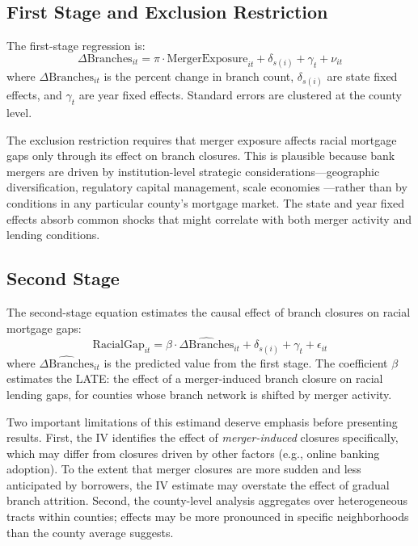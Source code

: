 \documentclass[12pt]{article}
\begin{document}
\subsection{First Stage and Exclusion Restriction}

The first-stage regression is:
\begin{equation}
\Delta\text{Branches}_{it} = \pi \cdot \text{MergerExposure}_{it} + \delta_{s(i)} + \gamma_t + \nu_{it}
\label{eq:first_stage}
\end{equation}
where $\Delta\text{Branches}_{it}$ is the percent change in branch count, $\delta_{s(i)}$ are state fixed effects, and $\gamma_t$ are year fixed effects. Standard errors are clustered at the county level.

The exclusion restriction requires that merger exposure affects racial mortgage gaps only through its effect on branch closures. This is plausible because bank mergers are driven by institution-level strategic considerations---geographic diversification, regulatory capital management, scale economies \citep{erel2011, berger1998}---rather than by conditions in any particular county's mortgage market. The state and year fixed effects absorb common shocks that might correlate with both merger activity and lending conditions.

\subsection{Second Stage}

The second-stage equation estimates the causal effect of branch closures on racial mortgage gaps:
\begin{equation}
\text{RacialGap}_{it} = \beta \cdot \widehat{\Delta\text{Branches}}_{it} + \delta_{s(i)} + \gamma_t + \epsilon_{it}
\label{eq:second_stage}
\end{equation}
where $\widehat{\Delta\text{Branches}}_{it}$ is the predicted value from the first stage. The coefficient $\beta$ estimates the LATE: the effect of a merger-induced branch closure on racial lending gaps, for counties whose branch network is shifted by merger activity.

Two important limitations of this estimand deserve emphasis before presenting results. First, the IV identifies the effect of \emph{merger-induced} closures specifically, which may differ from closures driven by other factors (e.g., online banking adoption). To the extent that merger closures are more sudden and less anticipated by borrowers, the IV estimate may overstate the effect of gradual branch attrition. Second, the county-level analysis aggregates over heterogeneous tracts within counties; effects may be more pronounced in specific neighborhoods than the county average suggests.
\end{document}
